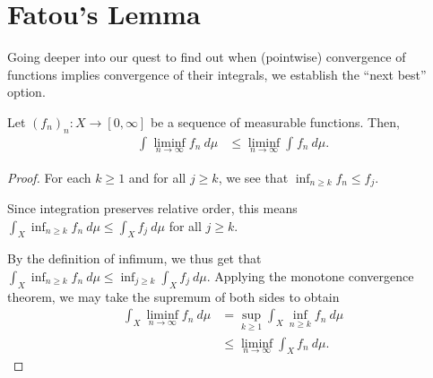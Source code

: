 \documentclass[10pt]{mypackage}
\begin{document}
\section{Fatou's Lemma}%
Going deeper into our quest to find out when (pointwise) convergence of functions implies convergence of their integrals, we establish the ``next best'' option.
\begin{theorem}
  Let $\left( f_n \right)_n\colon X\rightarrow [0,\infty]$ be a sequence of measurable functions. Then,
  \begin{align*}
    \int_{}^{} \liminf_{n\rightarrow\infty}f_n\:d\mu &\leq \liminf_{n\rightarrow\infty} \int_{}^{} f_n\:d\mu.
  \end{align*}
\end{theorem}
\begin{proof}
  For each $k\geq 1$ and for all $j\geq k$, we see that $\inf_{n\geq k}f_n \leq f_j$.\newline

  Since integration preserves relative order, this means $ \int_{X}^{} \inf_{n\geq k}f_n\:d\mu \leq \int_{X}^{} f_j\:d\mu $ for all $j\geq k$.\newline

  By the definition of infimum, we thus get that $ \int_{X}^{} \inf_{n\geq k}f_n\:d\mu \leq \inf_{j\geq k} \int_{X}^{} f_j\:d\mu $. Applying the monotone convergence theorem, we may take the supremum of both sides to obtain
  \begin{align*}
    \int_{X}^{} \liminf_{n\rightarrow\infty} f_n\:d\mu &= \sup_{k\geq 1} \int_{X}^{} \inf_{n\geq k}f_n\:d\mu\\
                                                       &\leq \liminf_{n\rightarrow\infty} \int_{X}^{} f_n\:d\mu.
  \end{align*}
\end{proof}
\end{document}
